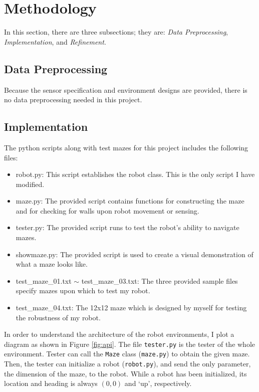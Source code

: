 \documentclass[11pt, oneside]{article}   	%
\begin{document}
\section{Methodology}
In this section, there are three subsections; they are: {\it Data Preprocessing}, {\it Implementation}, and {\it Refinement}. 
\subsection{Data Preprocessing}
Because the sensor specification and environment designs are provided, there is no data preprocessing needed in this project.
\subsection{Implementation}
The python scripts along with test mazes for this project includes the following files:
\begin{itemize}
\item robot.py: This script establishes the robot class. This is the only script I have modified.
\item maze.py: The provided script contains functions for constructing the maze and for checking for walls upon robot movement or sensing.
\item tester.py: The provided script runs to test the robot's ability to navigate mazes.
\item showmaze.py: The provided script is used to create a visual demonstration of what a maze looks like.
\item test\_maze\_01.txt $\sim$ test\_maze\_03.txt: The three provided sample files specify mazes upon which to test my robot.
\item test\_maze\_04.txt: The 12x12 maze which is designed by myself for testing the robustness of my robot.
\end{itemize}

In order to understand the architecture of the robot environments, I plot a diagram as shown in Figure \ref{fig:api}. The file \texttt{tester.py} is the tester of the whole environment. Tester can call the \texttt{Maze} class (\texttt{maze.py}) to obtain the given maze. Then, the tester can initialize a robot (\texttt{robot.py}), and send the only parameter, the dimension of the maze, to the robot. While a robot has been initialized, its location and heading is always $(0,0)$ and `up', respectively.
\end{document}
